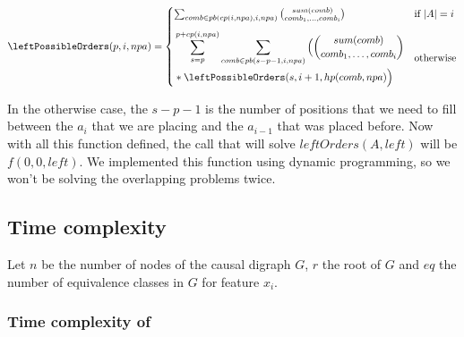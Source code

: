 \label{formula:left_possible_orders}

 \[
    \leftPossibleOrders(p,i,npa) = 
    \begin{cases} 
    \sum_{comb \in pb(cp(i,npa),i, npa)} \binom{ sum(comb)}{comb_1, \ldots, comb_i} & \text{if $|A|=i$} \\[2ex]
    \begin{aligned}
    &\sum_{s=p}^{p+cp(i,npa)} \sum_{comb \in pb(s-p-1,i, npa)} \Big(\binom{ sum(comb)}{comb_1, \ldots, comb_i} \\
    &  * \leftPossibleOrders(s,i+1,hp(comb, npa)\Big)
    \end{aligned}
    & \text{otherwise}
    \end{cases}
\]



In the otherwise case, the $s-p-1$ is the number of positions that we need to fill between the $a_i$ that we are placing and the $a_{i-1}$ that was placed before. Now with all this function defined, the call that will solve $leftOrders(A, left)$ will be $f(0,0,left)$. We implemented this function using dynamic programming, so we won't be solving the overlapping problems twice. 


\subsection{Time complexity}
Let $n$ be the number of nodes of the causal digraph $G$, $r$ the root of $G$ and $eq$ the number of equivalence classes in $G$ for feature $x_i$.

\subsubsection{Time complexity of \unrEqCl}

